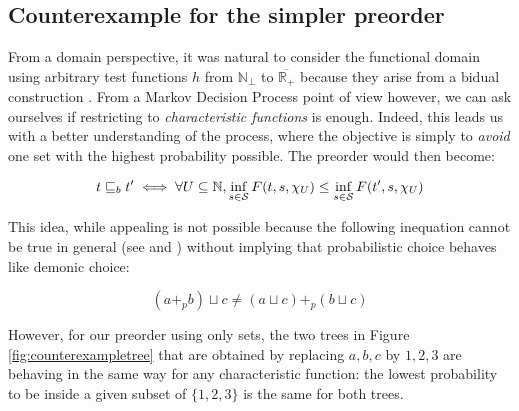 \subsection{Counterexample for the simpler preorder}

From a domain perspective, it was natural to consider 
the functional domain using arbitrary test functions 
$h$ from $\mathbb{N}_\bot$ to $\overline{\mathbb{R}_+}$
because they arise from a bidual construction \cite{JGL-mscs16}. 
From a Markov Decision Process point of view 
however, we can ask ourselves if restricting 
to \emph{characteristic functions} is enough. 
Indeed, this leads us with a better understanding 
of the process, where the objective is simply
to \emph{avoid} one set with the highest probability 
possible. The preorder would then become:

\begin{equation*}
    t \sqsubseteq_b t' \iff \forall U \subseteq \mathbb{N}, 
    \inf_{ s \in \mathcal{S}} F (t,s, \chi_U ) \leq \inf_{s \in \mathcal{S}}
    F (t',s, \chi_U )
\end{equation*}

This idea, while appealing is not possible because 
the following inequation cannot be true in general
(see \cite{Mislove2000} and \cite{mislove2004axioms}) without 
implying that probabilistic choice behaves like demonic choice: 

\begin{equation*}
    (a +_p b) \sqcup c \neq 
    (a \sqcup c) +_p (b \sqcup c)
\end{equation*}

However, for our preorder using only sets, the 
two trees in Figure \ref{fig:counterexampletree} that 
are obtained by replacing $a,b,c$ 
by $1,2,3$ are behaving in the same way for any 
characteristic function: the lowest probability to 
be inside a given subset of $\{1,2,3\}$ is the same 
for both trees.

